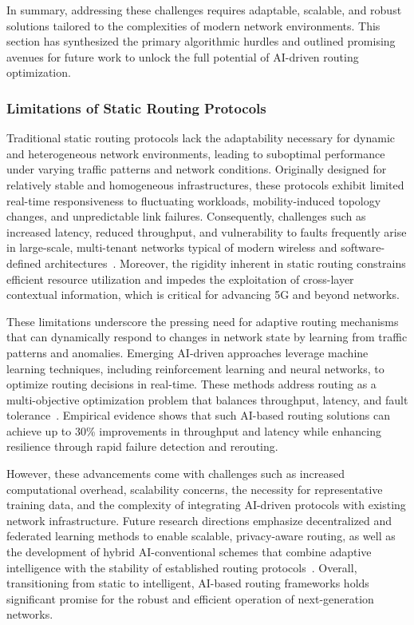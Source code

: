 \documentclass[sigconf]{acmart}
\begin{document}
In summary, addressing these challenges requires adaptable, scalable, and robust solutions tailored to the complexities of modern network environments. This section has synthesized the primary algorithmic hurdles and outlined promising avenues for future work to unlock the full potential of AI-driven routing optimization.

\subsubsection{Limitations of Static Routing Protocols}

Traditional static routing protocols lack the adaptability necessary for dynamic and heterogeneous network environments, leading to suboptimal performance under varying traffic patterns and network conditions. Originally designed for relatively stable and homogeneous infrastructures, these protocols exhibit limited real-time responsiveness to fluctuating workloads, mobility-induced topology changes, and unpredictable link failures. Consequently, challenges such as increased latency, reduced throughput, and vulnerability to faults frequently arise in large-scale, multi-tenant networks typical of modern wireless and software-defined architectures~\cite{ref53}. Moreover, the rigidity inherent in static routing constrains efficient resource utilization and impedes the exploitation of cross-layer contextual information, which is critical for advancing 5G and beyond networks.

These limitations underscore the pressing need for adaptive routing mechanisms that can dynamically respond to changes in network state by learning from traffic patterns and anomalies. Emerging AI-driven approaches leverage machine learning techniques, including reinforcement learning and neural networks, to optimize routing decisions in real-time. These methods address routing as a multi-objective optimization problem that balances throughput, latency, and fault tolerance~\cite{ref53}. Empirical evidence shows that such AI-based routing solutions can achieve up to 30\% improvements in throughput and latency while enhancing resilience through rapid failure detection and rerouting.

However, these advancements come with challenges such as increased computational overhead, scalability concerns, the necessity for representative training data, and the complexity of integrating AI-driven protocols with existing network infrastructure. Future research directions emphasize decentralized and federated learning methods to enable scalable, privacy-aware routing, as well as the development of hybrid AI-conventional schemes that combine adaptive intelligence with the stability of established routing protocols~\cite{ref53}. Overall, transitioning from static to intelligent, AI-based routing frameworks holds significant promise for the robust and efficient operation of next-generation networks.
\end{document}
